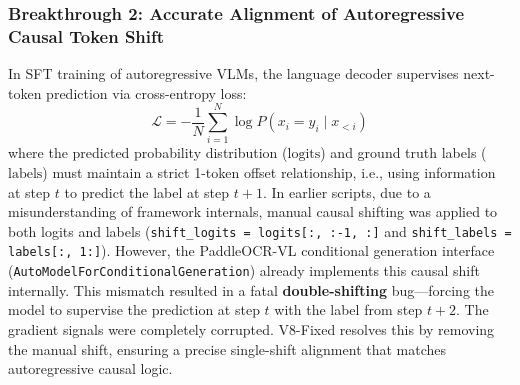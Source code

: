 \subsubsection{Breakthrough 2: Accurate Alignment of Autoregressive Causal Token Shift}
In SFT training of autoregressive VLMs, the language decoder supervises next-token prediction via cross-entropy loss:
\begin{equation}
\mathcal{L} = -\frac{1}{N} \sum_{i=1}^{N} \log P(x_i = y_i \mid x_{<i})
\end{equation}
where the predicted probability distribution ($\text{logits}$) and ground truth labels ($\text{labels}$) must maintain a strict 1-token offset relationship, i.e., using information at step $t$ to predict the label at step $t+1$.
In earlier scripts, due to a misunderstanding of framework internals, manual causal shifting was applied to both logits and labels (\texttt{shift\_logits = logits[:, :-1, :]} and \texttt{shift\_labels = labels[:, 1:]}). However, the PaddleOCR-VL conditional generation interface (\texttt{AutoModelForConditionalGeneration}) already implements this causal shift internally. This mismatch resulted in a fatal \textbf{double-shifting} bug---forcing the model to supervise the prediction at step $t$ with the label from step $t+2$. The gradient signals were completely corrupted. V8-Fixed resolves this by removing the manual shift, ensuring a precise single-shift alignment that matches autoregressive causal logic.


